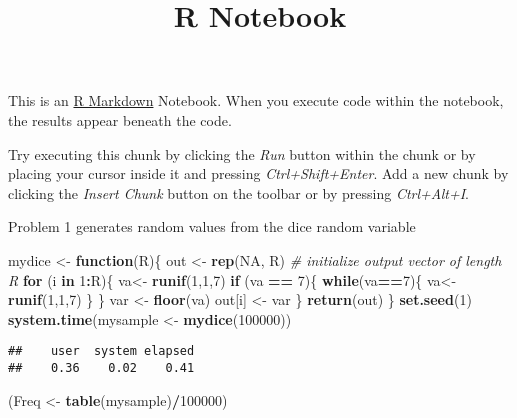 \documentclass[
]{article}
\title{R Notebook}
\author{}
\date{\vspace{-2.5em}}
\newenvironment{Shaded}{\begin{snugshade}}{\end{snugshade}}
\newcommand{\CommentTok}[1]{\textcolor[rgb]{0.56,0.35,0.01}{\textit{#1}}}
\newcommand{\ControlFlowTok}[1]{\textcolor[rgb]{0.13,0.29,0.53}{\textbf{#1}}}
\newcommand{\DecValTok}[1]{\textcolor[rgb]{0.00,0.00,0.81}{#1}}
\newcommand{\KeywordTok}[1]{\textcolor[rgb]{0.13,0.29,0.53}{\textbf{#1}}}
\newcommand{\NormalTok}[1]{#1}
\newcommand{\OperatorTok}[1]{\textcolor[rgb]{0.81,0.36,0.00}{\textbf{#1}}}
\newcommand{\OtherTok}[1]{\textcolor[rgb]{0.56,0.35,0.01}{#1}}
\newcommand{\StringTok}[1]{\textcolor[rgb]{0.31,0.60,0.02}{#1}}
\begin{document}
\maketitle

This is an \href{http://rmarkdown.rstudio.com}{R Markdown} Notebook.
When you execute code within the notebook, the results appear beneath
the code.

Try executing this chunk by clicking the \emph{Run} button within the
chunk or by placing your cursor inside it and pressing
\emph{Ctrl+Shift+Enter}. Add a new chunk by clicking the \emph{Insert
Chunk} button on the toolbar or by pressing \emph{Ctrl+Alt+I}.

Problem 1 generates random values from the dice random variable

\begin{Shaded}
\begin{Highlighting}[]
\NormalTok{mydice <-}\StringTok{ }\ControlFlowTok{function}\NormalTok{(R)\{}
\NormalTok{out <-}\StringTok{ }\KeywordTok{rep}\NormalTok{(}\OtherTok{NA}\NormalTok{, R) }\CommentTok{# initialize output vector of length R}
\ControlFlowTok{for}\NormalTok{ (i }\ControlFlowTok{in} \DecValTok{1}\OperatorTok{:}\NormalTok{R)\{}
\NormalTok{va<-}\StringTok{ }\KeywordTok{runif}\NormalTok{(}\DecValTok{1}\NormalTok{,}\DecValTok{1}\NormalTok{,}\DecValTok{7}\NormalTok{)}
\ControlFlowTok{if}\NormalTok{ (va }\OperatorTok{==}\StringTok{ }\DecValTok{7}\NormalTok{)\{}
\ControlFlowTok{while}\NormalTok{(va}\OperatorTok{==}\DecValTok{7}\NormalTok{)\{}
\NormalTok{  va<-}\StringTok{ }\KeywordTok{runif}\NormalTok{(}\DecValTok{1}\NormalTok{,}\DecValTok{1}\NormalTok{,}\DecValTok{7}\NormalTok{)}
\NormalTok{\}}
\NormalTok{\}}
\NormalTok{var <-}\StringTok{ }\KeywordTok{floor}\NormalTok{(va)}
\NormalTok{out[i] <-}\StringTok{ }\NormalTok{var}
\NormalTok{\}}
\KeywordTok{return}\NormalTok{(out)}
\NormalTok{\}}
\KeywordTok{set.seed}\NormalTok{(}\DecValTok{1}\NormalTok{)}
\KeywordTok{system.time}\NormalTok{(mysample <-}\StringTok{ }\KeywordTok{mydice}\NormalTok{(}\DecValTok{100000}\NormalTok{))}
\end{Highlighting}
\end{Shaded}

\begin{verbatim}
##    user  system elapsed 
##    0.36    0.02    0.41
\end{verbatim}

\begin{Shaded}
\begin{Highlighting}[]
\NormalTok{(Freq <-}\StringTok{ }\KeywordTok{table}\NormalTok{(mysample)}\OperatorTok{/}\DecValTok{100000}\NormalTok{)}
\end{Highlighting}
\end{Shaded}
\end{document}
